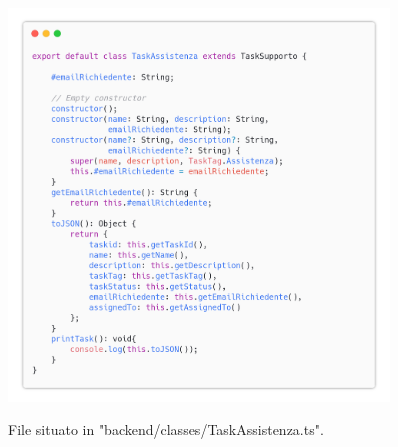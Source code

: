 \documentclass{report}
\begin{document}
\begin{figure}[H]
	\centering\includegraphics[width=0.9\textwidth]{images/code_task_assistenza.png}

	File situato in "backend/classes/TaskAssistenza.ts".
\end{figure}
\end{document}
